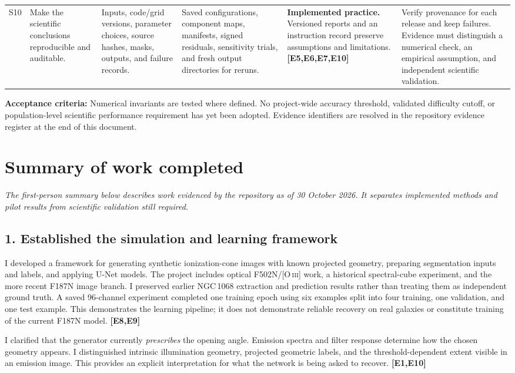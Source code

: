 \documentclass[10pt,letterpaper]{article}
\newcommand{\ev}[1]{\textcolor{ink}{\textbf{[#1]}}}
\newcommand{\status}[1]{\textbf{#1.}}
\newcommand{\oiii}{[O\,\textsc{iii}]}
\begin{document}
\begin{landscape}
\begin{longtable}{P{0.35in}P{1.35in}P{1.60in}P{1.82in}P{1.78in}P{2.10in}}
S10 & Make the scientific conclusions reproducible and auditable. &
Inputs, code/grid versions, parameter choices, source hashes, masks, outputs, and failure records. &
Saved configurations, component maps, manifests, signed residuals, sensitivity trials, and fresh output directories for reruns. &
\status{Implemented practice} Versioned reports and an instruction record preserve assumptions and limitations. \ev{E5,E6,E7,E10} &
Verify provenance for each release and keep failures. Evidence must distinguish a numerical check, an empirical assumption, and independent scientific validation. \\
\end{longtable}
\endgroup

\textbf{Acceptance criteria:} Numerical invariants are tested where defined. No project-wide accuracy threshold,
validated difficulty cutoff, or population-level scientific performance requirement has yet been adopted.
Evidence identifiers are resolved in the repository evidence register at the end of this document.
\end{landscape}

\section*{Summary of work completed}
\textit{The first-person summary below describes work evidenced by the repository as of 30 October 2026.
It separates implemented methods and pilot results from scientific validation still required.}

\subsection*{1. Established the simulation and learning framework}
I developed a framework for generating synthetic ionization-cone images with known projected geometry,
preparing segmentation inputs and labels, and applying U-Net models. The project includes optical
F502N/\oiii{} work, a historical spectral-cube experiment, and the more recent F187N image branch.
I preserved earlier NGC\,1068 extraction and prediction results rather than treating them as independent
ground truth. A saved 96-channel experiment completed one training epoch using six examples split into
four training, one validation, and one test example. This demonstrates the learning pipeline; it does
not demonstrate reliable recovery on real galaxies or constitute training of the current F187N model.
\ev{E8,E9}

I clarified that the generator currently \emph{prescribes} the opening angle. Emission spectra and filter
response determine how the chosen geometry appears. I distinguished intrinsic illumination geometry,
projected geometric labels, and the threshold-dependent extent visible in an emission image. This
provides an explicit interpretation for what the network is being asked to recover. \ev{E1,E10}
\end{document}
